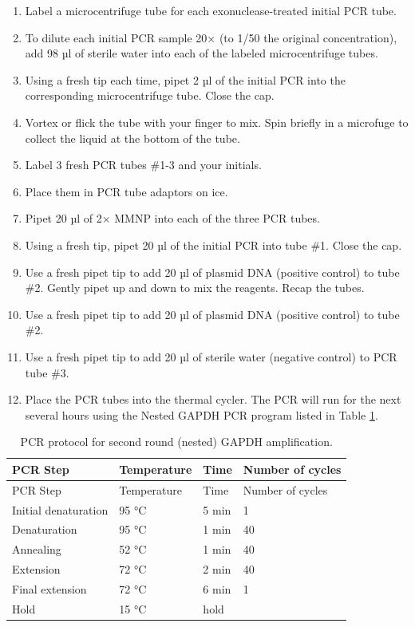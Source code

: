 \documentclass[]{book}
\providecommand{\tightlist}{%
  \setlength{\itemsep}{0pt}\setlength{\parskip}{0pt}}
\theoremstyle{definition}
\theoremstyle{definition}
\theoremstyle{definition}
\theoremstyle{remark}
\begin{document}
\begin{enumerate}
\def\labelenumi{\arabic{enumi}.}
\tightlist
\item
  Label a microcentrifuge tube for each exonuclease-treated initial PCR
  tube.
\item
  To dilute each initial PCR sample 20× (to 1/50 the original
  concentration), add 98 µl of sterile water into each of the labeled
  microcentrifuge tubes.
\item
  Using a fresh tip each time, pipet 2 µl of the initial PCR into the
  corresponding microcentrifuge tube. Close the cap.
\item
  Vortex or flick the tube with your finger to mix. Spin briefly in a
  microfuge to collect the liquid at the bottom of the tube.
\item
  Label 3 fresh PCR tubes \#1-3 and your initials.
\item
  Place them in PCR tube adaptors on ice.
\item
  Pipet 20 µl of 2× MMNP into each of the three PCR tubes.
\item
  Using a fresh tip, pipet 20 µl of the initial PCR into tube \#1. Close
  the cap.
\item
  Use a fresh pipet tip to add 20 µl of plasmid DNA (positive control)
  to tube \#2. Gently pipet up and down to mix the reagents. Recap the
  tubes.
\item
  Use a fresh pipet tip to add 20 µl of plasmid DNA (positive control)
  to tube \#2.
\item
  Use a fresh pipet tip to add 20 µl of sterile water (negative control)
  to PCR tube \#3.
\item
  Place the PCR tubes into the thermal cycler. The PCR will run for the
  next several hours using the Nested GAPDH PCR program listed in Table
  \ref{tab:nestedpcr}.
\end{enumerate}

\begin{longtable}[]{@{}llll@{}}
\caption{\label{tab:nestedpcr} PCR protocol for second round (nested) GAPDH
amplification.}\tabularnewline
\toprule
PCR Step & Temperature & Time & Number of cycles\tabularnewline
\midrule
\endfirsthead
\toprule
PCR Step & Temperature & Time & Number of cycles\tabularnewline
\midrule
\endhead
Initial denaturation & 95 °C & 5 min & 1\tabularnewline
Denaturation & 95 °C & 1 min & 40\tabularnewline
Annealing & 52 °C & 1 min & 40\tabularnewline
Extension & 72 °C & 2 min & 40\tabularnewline
Final extension & 72 °C & 6 min & 1\tabularnewline
Hold & 15 °C & hold &\tabularnewline
\bottomrule
\end{longtable}
\end{document}
